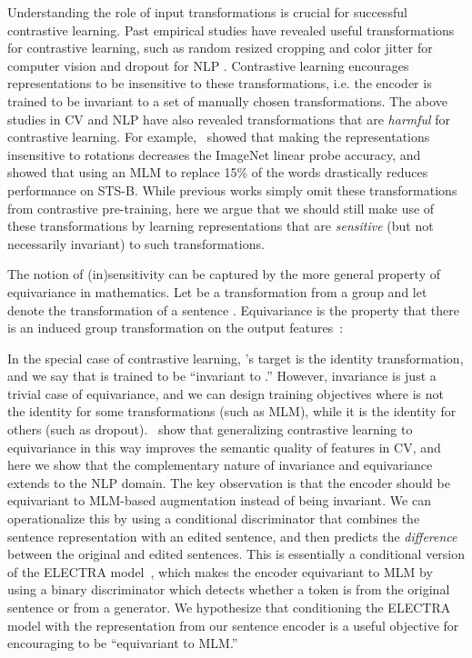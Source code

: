 \documentclass[11pt]{article}
\begin{document}
Understanding the role of input transformations is crucial for successful contrastive learning. Past empirical studies have revealed useful transformations for contrastive learning, such as random resized cropping and color jitter for computer vision \cite{chen2020simple} and dropout for NLP \cite{gao2021simcse}. Contrastive learning encourages representations to be insensitive to these transformations, i.e. the encoder is trained to be invariant to a set of manually chosen transformations. 
The above studies in CV and NLP have also revealed transformations that are \emph{harmful} for contrastive learning. For example,~\citet{chen2020simple} showed that making the representations insensitive to rotations decreases the ImageNet linear probe accuracy, and~\citet{gao2021simcse} showed that using an MLM to replace 15\% of the words drastically reduces performance on STS-B. While previous works simply omit these transformations from contrastive pre-training, here we argue that we should still make use of these transformations by learning representations that are  \emph{sensitive} (but not necessarily invariant) to such transformations.


The notion of (in)sensitivity can be captured by the more general property of equivariance in mathematics. Let  be a transformation from a group  and let  denote the transformation of a sentence . Equivariance is the property that there is an induced group transformation  on the output features~\citep{dangovski2021equivariant}:
\vspace{-5pt}

In the special case of contrastive learning, 's target is the identity transformation, and we say that  is trained to be ``invariant to .'' However, invariance is just a trivial case of equivariance, and we can design training objectives where  is not the identity for some transformations (such as MLM), while it is the identity for others (such as dropout). \citet{dangovski2021equivariant}~show that generalizing contrastive learning to equivariance in this way improves the semantic quality of features in CV, and here we show that the complementary nature of invariance and equivariance extends to the NLP domain. The key observation is that the encoder should be equivariant to MLM-based augmentation instead of being invariant. 
We can operationalize this by using a conditional discriminator that combines the sentence representation with an edited sentence, and then predicts the \emph{difference} between the original and edited sentences. This is essentially a conditional version of the ELECTRA model~\citep{clark2020electra}, which makes the encoder equivariant to MLM by using a binary discriminator which detects whether a token is from the original sentence or from a generator. We hypothesize that conditioning the ELECTRA model with the representation from our sentence encoder is a useful objective for encouraging  to be ``equivariant to MLM.''
\end{document}
